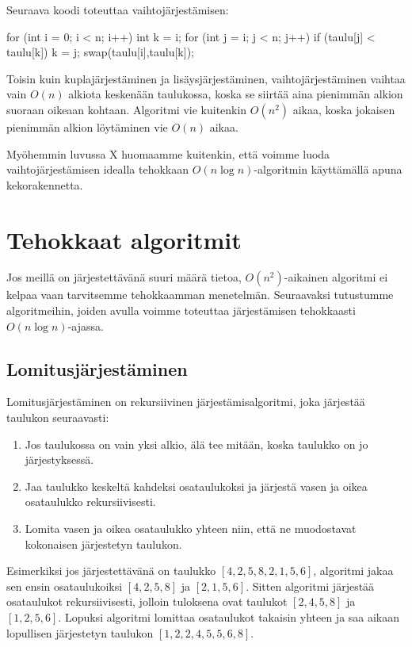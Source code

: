 Seuraava koodi toteuttaa vaihtojärjestämisen:

\begin{code}
for (int i = 0; i < n; i++) {
    int k = i;
    for (int j = i; j < n; j++) {
        if (taulu[j] < taulu[k]) k = j;
    }
    swap(taulu[i],taulu[k]);
}
\end{code}

Toisin kuin kuplajärjestäminen ja lisäysjärjestäminen,
vaihtojärjestäminen vaihtaa vain $O(n)$ alkiota keskenään
taulukossa, koska se siirtää aina pienimmän alkion
suoraan oikeaan kohtaan.
Algoritmi vie kuitenkin $O(n^2)$ aikaa,
koska jokaisen pienimmän alkion löytäminen vie $O(n)$ aikaa.

Myöhemmin luvussa X huomaamme kuitenkin,
että voimme luoda vaihtojärjestämisen idealla tehokkaan
$O(n \log n)$-algoritmin käyttämällä apuna kekorakennetta.

\section{Tehokkaat algoritmit}

Jos meillä on järjestettävänä suuri määrä tietoa,
$O(n^2)$-aikainen algoritmi ei kelpaa vaan tarvitsemme
tehokkaamman menetelmän.
Seuraavaksi tutustumme algoritmeihin,
joiden avulla voimme toteuttaa järjestämisen tehokkaasti $O(n \log n)$-ajassa.

\subsection{Lomitusjärjestäminen}

Lomitusjärjestäminen on rekursiivinen järjestämisalgoritmi,
joka järjestää taulukon seuraavasti:

\begin{enumerate}
\item Jos taulukossa on vain yksi alkio,
älä tee mitään, koska taulukko on jo järjestyksessä.
\item Jaa taulukko keskeltä kahdeksi osataulukoksi ja järjestä
vasen ja oikea osataulukko rekursiivisesti.
\item Lomita vasen ja oikea osataulukko yhteen niin, että ne muodostavat
kokonaisen järjestetyn taulukon.
\end{enumerate}

Esimerkiksi jos järjestettävänä on taulukko $[4,2,5,8,2,1,5,6]$,
algoritmi jakaa sen ensin osataulukoiksi $[4,2,5,8]$ ja $[2,1,5,6]$.
Sitten algoritmi järjestää osataulukot rekursiivisesti,
jolloin tuloksena ovat taulukot $[2,4,5,8]$ ja $[1,2,5,6]$.
Lopuksi algoritmi lomittaa osataulukot takaisin yhteen
ja saa aikaan lopullisen järjestetyn taulukon $[1,2,2,4,5,5,6,8]$.

